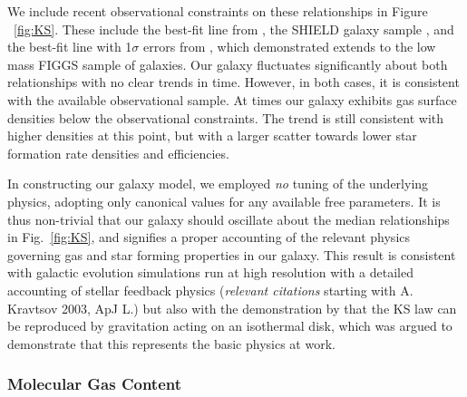 \documentclass[twocolumn]{aastex61}
\begin{document}
   We
include recent observational constraints on these relationships
    in Figure ~\ref{fig:KS}. 
   These 
include the best-fit line from \citet{Roychowdhury2014}, 
the SHIELD galaxy sample \citep{Teich2016}, 
  and the best-fit line with 1$\sigma$ errors from \citet{Shi2011}, which 
  \citet{Roychowdhury2017} demonstrated extends to the low mass FIGGS sample of galaxies.
Our galaxy fluctuates significantly about both relationships with no clear trends in time. However, in both cases, it is consistent with the available observational sample. At times our galaxy exhibits gas surface densities below the observational constraints. The trend is still consistent with higher densities at this point, but with a larger scatter towards lower star formation rate densities and efficiencies.

In constructing our galaxy model, we employed \textit{no} tuning of the underlying physics, adopting only canonical values for any available free parameters. It is thus non-trivial that our galaxy should oscillate about the median relationships in Fig.~\ref{fig:KS}, and signifies a proper accounting of the relevant physics governing gas and star forming properties in our galaxy. This result is consistent with 
galactic evolution simulations run at high resolution with a detailed accounting of stellar feedback physics (\textit{relevant citations}
   starting with A. Kravtsov 2003, ApJ L.)
   but also with the demonstration by \citet{Li2006} that the KS law can be reproduced 
   by gravitation acting on an isothermal disk, which was argued to demonstrate that 
   this represents the basic physics at work.

\subsubsection{Molecular Gas Content}
\label{sec:molecular gas content}
\end{document}
